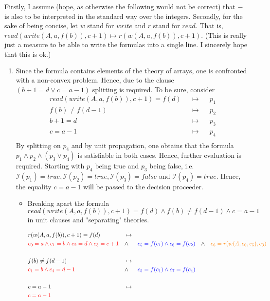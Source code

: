 \documentclass[11pt,a4paper]{article}
\begin{document}
Firstly, I assume  (hope, as otherwise the following would not be correct) that $-$ is also to be interpreted in the standard way over the integers. Secondly, for the sake of being concise, let $w$ stand for $write$ and $r$ stand for $read$. 
That is,  $read(write(A, a, f (b)), c + 1) \mapsto r(w(A, a, f (b)), c + 1)$.
(This is really just a measure to be able to write the formulas into a single line. I sincerely hope that this is ok.)
\begin{enumerate}
\item Since the formula contains elements of the theory of arrays, one is confronted with a non-convex problem. Hence, due to the clause $(b + 1 = d \lor c = a - 1)$ splitting is required. To be sure, consider 
\begin{align*}
&read(write(A, a, f (b)), c + 1) = f (d) & & \mapsto & &p_1& \\
& f (b) \neq f (d - 1) & & \mapsto & &p_2& \\
& b + 1 = d  & & \mapsto & &p_3& \\
&c = a - 1 & & \mapsto & &p_4& \\
\end{align*}
By splitting on $p_4$ and by unit propagation, one obtains that the formula $p_1 \land p_2 \land (p_3 \lor p_4)$ is satisfiable in both cases. Hence, further evaluation is required. Starting with $p_4$ being true and $p_3$ being false, i.e. $\mathcal{I}(p_1)=true,\mathcal{I}(p_2)=true, \mathcal{I}(p_3)=false$ and $\mathcal{I}(p_4)=true$. Hence, the equality $c = a - 1 $ will be passed to the decision proceeder.
\begin{itemize}
\item Breaking apart the formula $read(write(A, a, f (b)), c + 1) = f (d) \land f (b) \neq f (d - 1) \land c = a - 1$ in unit clauses  and "separating" theories.

 \hspace*{\dimexpr-\leftmargini-\leftmarginii-\leftmarginiii}\parbox{\linewidth}{%
 \small
\begin{align*}
& r(w(A, a, f (b)), c + 1) = f(d) && \mapsto &&  && &&  && \\
&\textcolor{red}{ c_0 = a \land c_1 = b \land c_2 = d \land c_3 = c +1 }  && \land && \textcolor{blue}{ c_5 = f(c_1) \land c_6 = f(c_2)} && \land && \textcolor{orange}{ c_6 = r(w(A, c_0, c_5), c_3)}  &\\
&  && &&  && &&  && \\
& f(b) \neq f (d - 1) && \mapsto &&  && &&  && \\
&\textcolor{red}{ c_1 = b \land c_4 = d-1 }  && \land && \textcolor{blue}{ c_5 = f(c_1) \land c_7 = f(c_4)} && && \textcolor{orange}{}  &\\
&  && &&  && &&  && \\
&  c = a - 1 && \mapsto &&  && &&  && \\
&\textcolor{red}{  c = a - 1 }  &&  && \textcolor{blue}{ } &&  && \textcolor{orange}{}  &\\
\end{align*}}\par


\end{itemize}
\end{enumerate}
\end{document}
